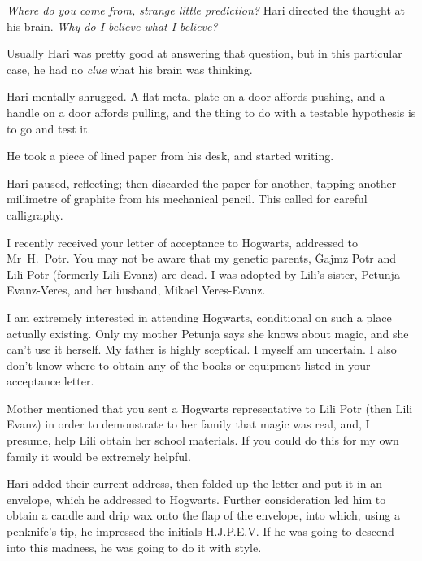 \emph{Where do you come from, strange little prediction?} Hari directed the thought at his brain. \emph{Why do I believe what I believe?}

Usually Hari was pretty good at answering that question, but in this particular case, he had no \emph{clue} what his brain was thinking.

Hari mentally shrugged. A flat metal plate on a door affords pushing, and a handle on a door affords pulling, and the thing to do with a testable hypothesis is to go and test it.

He took a piece of lined paper from his desk, and started writing.

\begin{writtenNote}
\end{writtenNote}

Hari paused, reflecting; then discarded the paper for another, tapping another millimetre of graphite from his mechanical pencil. This called for careful calligraphy.

\begin{writtenNote}


I recently received your letter of acceptance to Hogwarts, addressed to Mr~H.~Potr. You may not be aware that my genetic parents, Ĝajmz Potr and Lili Potr (formerly Lili Evanz) are dead. I was adopted by Lili’s sister, Petunja Evanz-Veres, and her husband, Mikael Veres-Evanz.

I am extremely interested in attending Hogwarts, conditional on such a place actually existing. Only my mother Petunja says she knows about magic, and she can’t use it herself. My father is highly sceptical. I myself am uncertain. I also don’t know where to obtain any of the books or equipment listed in your acceptance letter.

Mother mentioned that you sent a Hogwarts representative to Lili Potr (then Lili Evanz) in order to demonstrate to her family that magic was real, and, I presume, help Lili obtain her school materials. If you could do this for my own family it would be extremely helpful.

\end{writtenNote}

Hari added their current address, then folded up the letter and put it in an envelope, which he addressed to Hogwarts. Further consideration led him to obtain a candle and drip wax onto the flap of the envelope, into which, using a penknife’s tip, he impressed the initials H.J.P.E.V\@. If he was going to descend into this madness, he was going to do it with style.

